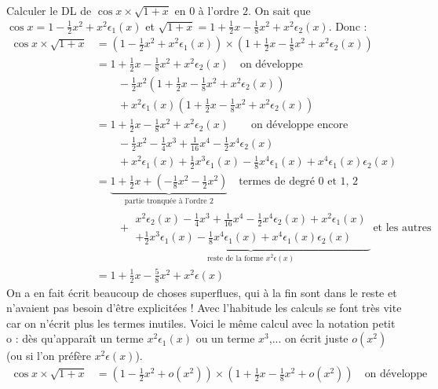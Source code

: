 \documentclass[class=report,crop=false]{standalone}
\begin{document}
\begin{exemple}
Calculer le DL de $\cos x \times \sqrt{1+x}$ en $0$  à l'ordre $2$.
On sait que 
$\cos x=1-\frac{1}{2}x^2+x^2\epsilon_1(x)$
et $\sqrt{1+x}=1+\frac{1}{2}x-\frac{1}{8}x^2+x^2\epsilon_2(x)$.
Donc :
\begin{align*}
\cos x \times \sqrt{1+x}
  & = \left( 1-\frac{1}{2}x^2+x^2\epsilon_1(x)\right)\times \left(1+\frac{1}{2}x-\frac{1}{8}x^2+x^2\epsilon_2(x)\right)  \\
  & = 1+\frac{1}{2}x-\frac{1}{8}x^2+x^2\epsilon_2(x)\quad \text{on développe}\\
  &  \qquad -\frac{1}{2}x^2\left(1+\frac{1}{2}x-\frac{1}{8}x^2+x^2\epsilon_2(x)\right) \\
  &  \qquad +x^2\epsilon_1(x)\left(1+\frac{1}{2}x-\frac{1}{8}x^2+x^2\epsilon_2(x)\right) \\
  & = 1+\frac{1}{2}x-\frac{1}{8}x^2+x^2\epsilon_2(x) \quad \quad \text{on développe encore} \\
  &  \qquad -\frac{1}{2}x^2-\frac{1}{4}x^3+\frac{1}{16}x^4-\frac12x^4\epsilon_2(x)\\
  &  \qquad +x^2\epsilon_1(x) +\frac{1}{2}x^3\epsilon_1(x)-\frac{1}{8}x^4\epsilon_1(x)+x^4\epsilon_1(x)\epsilon_2(x) \\
  & = \underbrace{1+\frac{1}{2}x + \left(-\frac{1}{8}x^2-\frac{1}{2}x^2\right)}_{\text{partie tronquée à l'ordre $2$}}
\quad \text{termes de degré $0$ et $1$, $2$}\\
  & \qquad  + \underbrace{
  \begin{array}{cc}
  x^2\epsilon_2(x) -\frac{1}{4}x^3+\frac{1}{16}x^4-\frac12x^4\epsilon_2(x) +x^2\epsilon_1(x) \\
+\frac{1}{2}x^3\epsilon_1(x)-\frac{1}{8}x^4\epsilon_1(x)+x^4\epsilon_1(x)\epsilon_2(x)
  \end{array}
}_{\text{reste de la forme }
x^2\epsilon(x)} \ \text{et les autres}\\
  & = 1+\frac{1}{2}x-\frac{5}{8}x^2+x^2\epsilon(x)
\end{align*}
On a en fait écrit beaucoup de choses superflues, qui à la fin sont dans le reste et n'avaient pas besoin d'être explicitées !
Avec l'habitude les calculs se font très vite car on n'écrit plus les termes inutiles. Voici le même calcul
avec la notation \og petit o \fg{} : dès qu'apparaît un terme $x^2\epsilon_1(x)$ ou un terme $x^3$,... on écrit juste $o(x^2)$
(ou si l'on préfère $x^2\epsilon(x)$).
\begin{align*}
\cos x \times \sqrt{1+x}
  & = \left( 1-\frac{1}{2}x^2+ o(x^2)\right)\times \left(1+\frac{1}{2}x-\frac{1}{8}x^2+o(x^2)\right)  \quad \text{on développe}\\

\end{align*}
\end{exemple}
\end{document}
